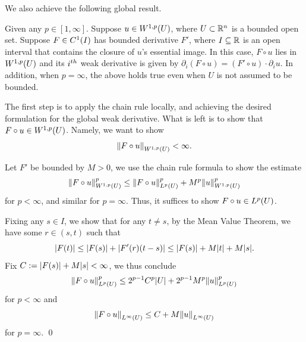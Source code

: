 \documentclass{ifacconf}
\begin{document}
We also achieve the following global result. 
\begin{cor}
\label{Chain Rule Variation for Weak Derivatives on Bounded Domain}
\cite[Corollary 2.5.9]{yixing_multiplicative_2025}
    Given any $p \in [1,\infty]$. Suppose $u \in {W^{1,p}_{}{\left ( U \right )}}$, where $U \subset {\mathbb{R}}^n$ is a bounded open set. Suppose $F \in {C^{1}_{}{\left ( I \right )}}$ has bounded derivative $F'$, where $I \subseteq {\mathbb{R}}$ is an open interval that contains the closure of $u$'s essential image. In this case, $F \circ u$ lies in ${W^{1,p}_{}{\left ( U \right )}}$ and its $i^{th}$ weak derivative is given by $\partial_i(F \circ u) = (F' \circ u) \cdot \partial_iu$. In addition, when $p = \infty$, the above holds true even when $U$ is not assumed to be bounded.
\begin{pf}
    The first step is to apply the chain rule locally, and achieving the desired formulation for the global weak derivative. What is left is to show that $F \circ u \in {W^{1,p}_{}{\left ( U \right )}}$. Namely, we want to show $${\left\| F \circ u\right\|}_{{W^{1,p}_{}{\left ( U \right )}}} < \infty.$$
    
    Let $F'$ be bounded by $M > 0$, we use the chain rule formula to show the estimate $${\left\| F \circ u\right\|}_{{W^{1,p}_{}{\left ( U \right )}}}^p \leq {\left\| F \circ u\right\|}_{L^{p}_{}{\left ( U \right )}}^p + M^p{\left\| u\right\|}_{W^{1,p}_{}{\left ( U \right )}}^p$$ for $p < \infty$, and similar for $p = \infty$. Thus, it suffices to show $F \circ u \in {L^{p}_{}{\left ( U \right )}}$. 

    Fixing any $s \in I$, we show that for any $t \neq s$, by the Mean Value Theorem, we have some $r \in (s,t)$ such that $${\left\vert F(t) \right\vert} \leq {\left\vert F(s) \right\vert} + {\left\vert F'(r)(t-s) \right\vert} \leq {\left\vert F(s) \right\vert} + M{\left\vert t \right\vert} + M{\left\vert s \right\vert}.$$
    Fix $C := {\left\vert F(s) \right\vert} + M{\left\vert s \right\vert} < \infty$, we thus conclude $${\left\| F \circ u\right\|}_{L^{p}_{}{\left ( U \right )}}^p \leq 2^{p-1}C^p{\left\vert U \right\vert} + 2^{p-1}M^p{\left\| u\right\|}_{L^{p}_{}{\left ( U \right )}}^p$$ for $p < \infty$ and $${\left\| F \circ u\right\|}_{L^{\infty}_{}{\left ( U \right )}} \leq C + M{\left\| u\right\|}_{L^{\infty}_{}{\left ( U \right )}}$$ for $p = \infty$. \qed
\end{pf}
\end{cor}


\end{document}
